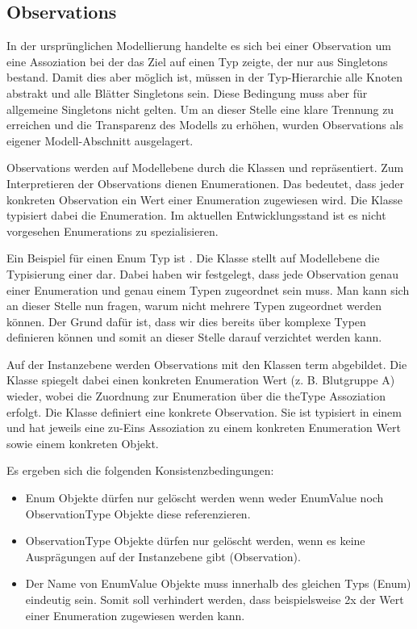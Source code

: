 \subsection{Observations}\label{Observations}
In der ursprünglichen Modellierung handelte es sich bei einer Observation um eine Assoziation bei der das Ziel auf einen 
Typ zeigte, der nur aus Singletons bestand. Damit dies aber möglich ist, müssen in der Typ-Hierarchie alle Knoten 
abstrakt und alle Blätter Singletons sein. Diese Bedingung muss aber für allgemeine Singletons nicht gelten. Um an dieser 
Stelle eine klare Trennung zu erreichen und die Transparenz des Modells zu erhöhen, wurden Observations als eigener Modell-Abschnitt ausgelagert.


Observations werden auf Modellebene durch die Klassen  und  repräsentiert. 
Zum Interpretieren der Observations dienen Enumerationen. Das bedeutet, dass jeder konkreten Observation
ein Wert einer Enumeration zugewiesen wird. Die Klasse  typisiert dabei die Enumeration. 
Im aktuellen Entwicklungsstand ist es nicht vorgesehen Enumerations zu spezialisieren.

Ein Beispiel für einen Enum Typ ist . Die Klasse  stellt auf Modellebene die 
Typisierung einer  dar. Dabei haben wir festgelegt, dass jede Observation genau einer Enumeration 
und genau einem Typen zugeordnet sein muss. Man kann sich an dieser Stelle nun fragen, warum nicht mehrere Typen 
zugeordnet werden können. Der Grund dafür ist, dass wir dies bereits über komplexe Typen definieren können und somit 
an dieser Stelle darauf verzichtet werden kann.

Auf der Instanzebene werden Observations mit den Klassen  term  abgebildet. 
Die Klasse  spiegelt dabei einen konkreten Enumeration Wert (z. B. Blutgruppe A) wieder, 
wobei die Zuordnung zur Enumeration über die theType Assoziation erfolgt. Die Klasse  definiert eine konkrete Observation. 
Sie ist typisiert in einem  und hat jeweils eine zu-Eins Assoziation zu einem konkreten Enumeration Wert sowie einem konkreten Objekt.

Es ergeben sich die folgenden Konsistenzbedingungen:
\begin{itemize}
  \item Enum Objekte dürfen nur gelöscht werden wenn weder EnumValue noch ObservationType Objekte diese referenzieren.
  \item ObservationType Objekte dürfen nur gelöscht werden, wenn es keine Ausprägungen auf der Instanzebene gibt (Observation).
  \item Der Name von EnumValue Objekte muss innerhalb des gleichen Typs (Enum) eindeutig sein. Somit soll verhindert werden, dass beispielsweise 2x der Wert  einer Enumeration  zugewiesen werden kann.
\end{itemize}

